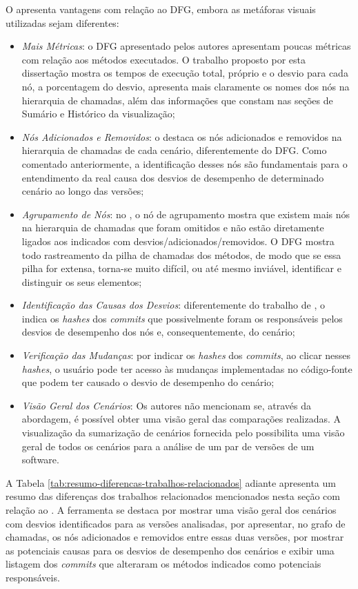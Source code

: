 O {\textit{\toolName}} apresenta vantagens com relação ao DFG, embora as metáforas visuais utilizadas sejam diferentes:
\begin{itemize}
   \item \textit{Mais Métricas}: o DFG apresentado pelos autores apresentam poucas métricas com relação aos métodos executados. O trabalho proposto por esta dissertação mostra os tempos de execução total, próprio e o desvio para cada nó, a porcentagem do desvio, apresenta mais claramente os nomes dos nós na hierarquia de chamadas, além das informações que constam nas seções de Sumário e Histórico da visualização;
   \item \textit{Nós Adicionados e Removidos}: o {\textit{\toolName}} destaca os nós adicionados e removidos na hierarquia de chamadas de cada cenário, diferentemente do DFG. Como comentado anteriormente, a identificação desses nós são fundamentais para o entendimento da real causa dos desvios de desempenho de determinado cenário ao longo das versões;
   \item \textit{Agrupamento de Nós}: no {\textit{\toolName}}, o nó de agrupamento mostra que existem mais nós na hierarquia de chamadas que foram omitidos e não estão diretamente ligados aos indicados com desvios/adicionados/removidos. O DFG mostra todo rastreamento da pilha de chamadas dos métodos, de modo que se essa pilha for extensa, torna-se muito difícil, ou até mesmo inviável, identificar e distinguir os seus elementos;
   \item \textit{Identificação das Causas dos Desvios}: diferentemente do trabalho de \citeauthor{Bezemer2015}, o {\textit{\toolName}} indica os \textit{hashes} dos \textit{commits} que possivelmente foram os responsáveis pelos desvios de desempenho dos nós e, consequentemente, do cenário;
   \item \textit{Verificação das Mudanças}: por indicar os \textit{hashes} dos \textit{commits}, ao clicar nesses \textit{hashes}, o usuário pode ter acesso às mudanças implementadas no código-fonte que podem ter causado o desvio de desempenho do cenário;
   \item \textit{Visão Geral dos Cenários}: Os autores não mencionam se, através da abordagem, é possível obter uma visão geral das comparações realizadas. A visualização da sumarização de cenários fornecida pelo {\textit{\toolName}} possibilita uma visão geral de todos os cenários para a análise de um par de versões de um software.
\end{itemize}

A Tabela \ref{tab:resumo-diferencas-trabalhos-relacionados} adiante apresenta um resumo das diferenças dos trabalhos relacionados mencionados nesta seção com relação ao \textit{\toolName}. A ferramenta se destaca por mostrar uma visão geral dos cenários com desvios identificados para as versões analisadas, por apresentar, no grafo de chamadas, os nós adicionados e removidos entre essas duas versões, por mostrar as potenciais causas para os desvios de desempenho dos cenários e exibir uma listagem dos \textit{commits} que alteraram os métodos indicados como potenciais responsáveis. 


